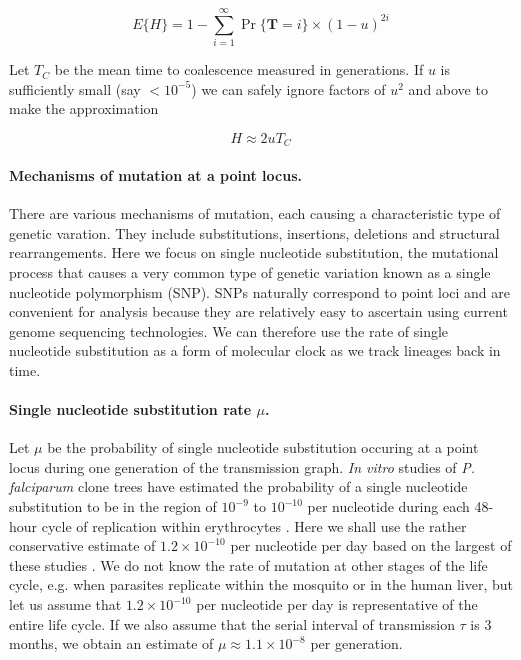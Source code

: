 \documentclass[_main.tex]{subfiles}
\begin{document}
\begin{equation*}
E\{ H \} = 1 - \sum_{i=1}^\infty \Pr \{ \textbf{T} = i \} \times (1-u)^{2i}
\label{eq:main_het_pdf}
\end{equation*}

Let $T_C$ be the mean time to coalescence measured in generations.  If $u$ is sufficiently small (say $<10^{-5}$) we can safely ignore factors of $u^2$ and above to make the approximation

\begin{equation}
H \approx 2 u T_C
\label{eq:main_het_approx}
\end{equation}

\paragraph{Mechanisms of mutation at a point locus.} There are various mechanisms of mutation, each causing a characteristic type of genetic varation.  They include substitutions, insertions, deletions and structural rearrangements.  Here we focus on single nucleotide substitution, the mutational process that causes a very common type of genetic variation known as a single nucleotide polymorphism (SNP).  SNPs naturally correspond to point loci and are convenient for analysis because they are relatively easy to ascertain using current genome sequencing technologies.  We can therefore use the rate of single nucleotide substitution as a form of molecular clock as we track lineages back in time.

\paragraph{Single nucleotide substitution rate $\mu$.}  Let $\mu$ be the probability of single nucleotide substitution occuring at a point locus during one generation of the transmission graph.  \textit{In vitro} studies of \textit{P. falciparum} clone trees have estimated the probability of a single nucleotide substitution to be in the region of $10^{-9}$ to $10^{-10}$ per nucleotide during each 48-hour cycle of replication within erythrocytes \cite{Bopp2013,Claessens2014,Hamilton2016}.  Here we shall use the rather conservative estimate of $1.2 \times 10^{-10}$ per nucleotide per day based on the largest of these studies \cite{Hamilton2016}.  We do not know the rate of mutation at other stages of the life cycle, e.g. when parasites replicate within the mosquito or in the human liver, but let us assume that $1.2 \times 10^{-10}$ per nucleotide per day is representative of the entire life cycle.  If we also assume that the serial interval of transmission $\tau$ is 3 months, we obtain an estimate of $\mu \approx 1.1 \times 10^{-8}$ per generation.  
\end{document}
